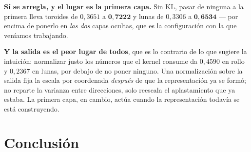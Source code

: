 \documentclass[11pt,a4paper]{article}
\begin{document}
\textbf{Sí se arregla, y el lugar es la primera capa.} Sin KL, pasar de ninguna a
la primera lleva toroides de $0{,}3651$ a $\mathbf{0{,}7222}$ y lunas de $0{,}3306$
a $\mathbf{0{,}6534}$ --- por encima de ponerlo en \emph{las dos} capas ocultas,
que es la configuración con la que veníamos trabajando.

\textbf{Y la salida es el peor lugar de todos}, que es lo contrario de lo que
sugiere la intuición: normalizar justo los números que el kernel consume da
$0{,}4590$ en rollo y $0{,}2367$ en lunas, por debajo de no poner ninguno. Una
normalización sobre la salida fija la escala por coordenada \emph{después} de que
la representación ya se formó; no reparte la varianza entre direcciones, solo
reescala el aplastamiento que ya estaba. La primera capa, en cambio, actúa cuando
la representación todavía se está construyendo.

\section{Conclusión}
\end{document}

